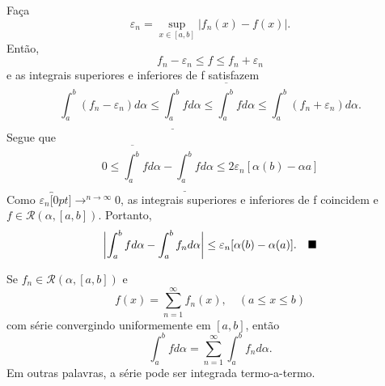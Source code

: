 \documentclass[../analysis_notes.tex]{subfiles}
\begin{document}
\begin{proof*}
	Faça
	\[
		\varepsilon_{n}=\sup_{x\in [a, b]}|f_{n}(x)-f(x)|.
	\]
	Então,
	\[
		f_{n}-\varepsilon_{n}\leq f \leq f_{n}+\varepsilon_{n}
	\]
	e as integrais superiores e inferiores de f satisfazem
	\[
		\int_{a}^{b}(f_{n}-\varepsilon_{n})d\alpha \leq \underline{\int_{a}^{b}}f d\alpha \leq \overline{\int_{a}^{b}}fd\alpha \leq \int_{a}^{b}(f_{n}+\varepsilon_{n})d\alpha.
	\]
	Segue que
	\[
		0 \leq \overline{\int_{a}^{b}}fd\alpha -\underline{\int_{a}^{b}}fd\alpha \leq 2\varepsilon_{n}[\alpha(b)-\alpha {a}]
	\]
	Como \(\varepsilon_{n}\overbracket[0pt]{\longrightarrow}^{n\to \infty}0\), as integrais superiores e inferiores de f coincidem e \(f\in \mathcal{R}(\alpha , [a, b])\). Portanto,
	\[
		\biggl\vert \int_{a}^{b}fd\alpha -\int_{a}^{b}f_{n}d\alpha  \biggr\vert\leq \varepsilon_{n}[\alpha (b)-\alpha(a)].\quad \text{$\blacksquare$}
	\]
\end{proof*}
\begin{crl*}
	Se \(f_{n}\in \mathcal{R}(\alpha , [a, b])\) e
	\[
		f(x)=\sum\limits_{n=1}^{\infty}f_{n}(x),\quad (a\leq x\leq b)
	\]
	com série convergindo uniformemente em \([a, b]\), então
	\[
		\int_{a}^{b}fd\alpha =\sum\limits_{n=1}^{\infty}\int_{a}^{b}f_{n}d\alpha .
	\]
	Em outras palavras, a série pode ser integrada termo-a-termo.
\end{crl*}
\end{document}
